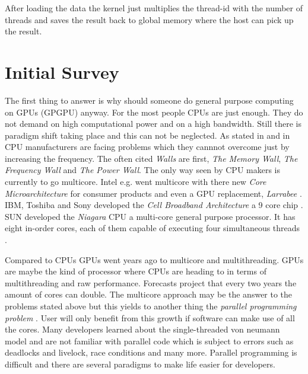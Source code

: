 After loading the data the kernel just multiplies the thread-id with the number
of threads and saves the result back to global memory where the host can pick up
the result.


\section*{Initial Survey} 
\label{sub:initial_survey} 
The first thing to answer is why should someone do general purpose computing on
GPUs (GPGPU) anyway. For the most people CPUs are just enough. They do not
demand on high computational power and on a high bandwidth. Still there is
paradigm shift taking place and this can not be neglected. As stated in
\cite{citeulike:1187394} and in \cite{citeulike:3421647} CPU manufacturers are
facing problems which they cannnot overcome just by increasing the frequency.
The often cited \emph{Walls} are first, \emph{The Memory
Wall}\cite{citeulike:457955}, \emph{The Frequency Wall} and \emph{The Power
Wall}. The only way seen by CPU makers is currently to go multicore. Intel e.g.
went multicore with there new \emph{Core Microarchitecture} for consumer
products and even a \gls{GPU} replacement, \emph{Larrabee} \cite{citeulike:3153758}.
IBM, Toshiba and Sony developed the \emph{Cell Broadband Architecture} a 9 core
chip \cite{citeulike:1243173}. SUN developed the \emph{Niagara} CPU a multi-core
general purpose processor. It has eight in-order cores, each of them capable of
executing four simultaneous threads \cite{citeulike:3743958}.

Compared to CPUs GPUs went years ago to multicore and multithreading. GPUs are
maybe the kind of processor where CPUs are heading to in terms of multithreading
and raw performance. Forecasts project that every two years the amount of cores
can double. The multicore approach may be the answer to the problems stated
above but this yields to another thing the \emph{parallel programming problem}
\cite{citeulike:3750573}. User will only benefit from this growth if software
can make use of all the cores. Many developers learned about the
single-threaded von neumann model and are not familiar with parallel code which
is subject to errors such as deadlocks and livelock, race conditions and many
more. Parallel programming is difficult and there are several paradigms to make
life easier for developers. 

